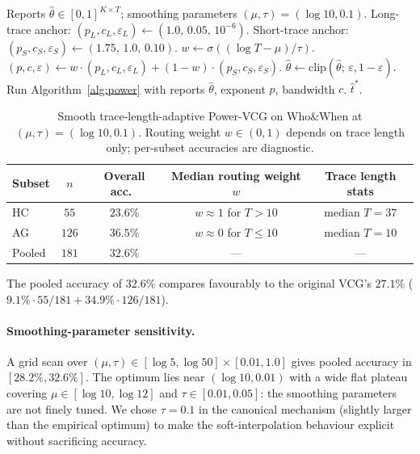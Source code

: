 \documentclass[11pt]{article}
\newcommand{\thetahat}{\hat{\theta}}
\begin{document}
\begin{algorithm}[H]
\caption{Smooth Trace-Length-Adaptive Power-VCG}
\label{alg:adaptive}
\begin{algorithmic}[1]
\Require Reports $\thetahat \in [0, 1]^{K \times T}$; smoothing parameters $(\mu, \tau) = (\log 10, 0.1)$.
\State Long-trace anchor:  $(p_L, c_L, \varepsilon_L) \gets (1.0,\, 0.05,\, 10^{-6})$.
\State Short-trace anchor: $(p_S, c_S, \varepsilon_S) \gets (1.75,\, 1.0,\, 0.10)$.
\State $w \gets \sigma\!\left((\log T - \mu)/\tau\right)$.
\State $(p, c, \varepsilon) \gets w \cdot (p_L, c_L, \varepsilon_L) + (1 - w) \cdot (p_S, c_S, \varepsilon_S)$.
\State $\thetahat \gets \mathrm{clip}(\thetahat;\, \varepsilon, 1 - \varepsilon)$.
\State Run Algorithm~\ref{alg:power} with reports $\thetahat$, exponent $p$, bandwidth $c$.
\State \Return $\hat t^*$.
\end{algorithmic}
\end{algorithm}

\begin{table}[h]
\centering
\small
\caption{Smooth trace-length-adaptive Power-VCG on Who\&When at
$(\mu, \tau) = (\log 10, 0.1)$. Routing weight $w \in (0, 1)$ depends on
trace length only; per-subset accuracies are diagnostic.}
\label{tab:adaptive}
\begin{tabular}{lcccc}
\toprule
Subset & $n$ & Overall acc.\ & Median routing weight $w$ & Trace length stats \\
\midrule
HC      & $55$  & $\mathbf{23.6\%}$ & $w \approx 1$ for $T > 10$  & median $T = 37$ \\
AG      & $126$ & $\mathbf{36.5\%}$ & $w \approx 0$ for $T \leq 10$ & median $T = 10$ \\
\midrule
Pooled  & $181$ & $\mathbf{32.6\%}$ & --- & --- \\
\bottomrule
\end{tabular}
\end{table}

The pooled accuracy of $32.6\%$ compares favourably to the original
VCG's $27.1\%$ ($9.1\% \cdot 55/181 + 34.9\% \cdot 126/181$).

\paragraph{Smoothing-parameter sensitivity.}
A grid scan over $(\mu, \tau) \in [\log 5, \log 50] \times [0.01, 1.0]$
gives pooled accuracy in $[28.2\%, 32.6\%]$. The optimum lies near
$(\log 10, 0.01)$ with a wide flat plateau covering $\mu \in [\log 10, \log 12]$
and $\tau \in [0.01, 0.05]$: the smoothing parameters are not finely tuned.
We chose $\tau = 0.1$ in the canonical mechanism (slightly larger than
the empirical optimum) to make the soft-interpolation behaviour explicit
without sacrificing accuracy.
\end{document}
